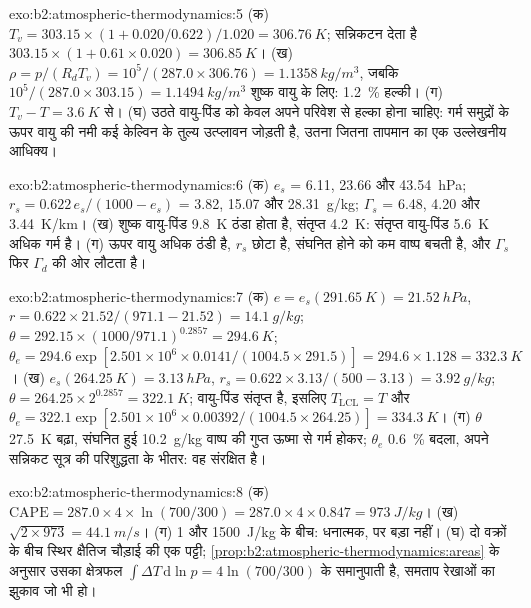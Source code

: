 \begin{solution}{exo:b2:atmospheric-thermodynamics:5}
(क) $T_v = 303.15 \times (1 + 0.020/0.622)/1.020 = \qty{306.76}{K}$; सन्निकटन देता है
$303.15 \times (1 + 0.61 \times 0.020) = \qty{306.85}{K}$। (ख) $\rho = p/(R_dT_v) = 10^5/(287.0
\times 306.76) = \qty{1.1358}{kg/m^3}$, जबकि $10^5/(287.0 \times 303.15) =
\qty{1.1494}{kg/m^3}$ शुष्क वायु के लिए: \qty{1.2}{\percent} हल्की। (ग) $T_v - T =
\qty{3.6}{K}$ से। (घ) उठते वायु-पिंड को केवल अपने परिवेश से हल्का होना चाहिए: गर्म समुद्रों के ऊपर
वायु की नमी कई केल्विन के तुल्य उत्प्लावन जोड़ती है, उतना जितना तापमान का
एक उल्लेखनीय आधिक्य।
\end{solution}

\begin{solution}{exo:b2:atmospheric-thermodynamics:6}
(क) $e_s$ = 6.11, 23.66 और \qty{43.54}{hPa}; $r_s = 0.622\,e_s/(1000 - e_s)$ = 3.82, 15.07 और
\qty{28.31}{g/kg}; $\Gamma_s$ = 6.48, 4.20 और \qty{3.44}{K/km}। (ख) शुष्क वायु-पिंड
\qty{9.8}{K} ठंडा होता है, संतृप्त \qty{4.2}{K}: संतृप्त वायु-पिंड \qty{5.6}{K} अधिक गर्म है।
(ग) ऊपर वायु अधिक ठंडी है, $r_s$ छोटा है, संघनित होने को कम वाष्प बचती है, और
$\Gamma_s$ फिर $\Gamma_d$ की ओर लौटता है।
\end{solution}

\begin{solution}{exo:b2:atmospheric-thermodynamics:7}
(क) $e = e_s(\qty{291.65}{K}) = \qty{21.52}{hPa}$, $r = 0.622 \times 21.52/(971.1 - 21.52) =
\qty{14.1}{g/kg}$; $\theta = 292.15 \times (1000/971.1)^{0.2857} = \qty{294.6}{K}$; $\theta_e =
294.6 \exp[2.501 \times 10^6 \times 0.0141/(1004.5 \times 291.5)] = 294.6 \times 1.128 =
\qty{332.3}{K}$। (ख) $e_s(\qty{264.25}{K}) = \qty{3.13}{hPa}$, $r_s = 0.622 \times 3.13/(500 -
3.13) = \qty{3.92}{g/kg}$; $\theta = 264.25 \times 2^{0.2857} = \qty{322.1}{K}$; वायु-पिंड
संतृप्त है, इसलिए $T_{\text{LCL}} = T$ और $\theta_e = 322.1 \exp[2.501 \times 10^6 \times
0.00392/(1004.5 \times 264.25)] = \qty{334.3}{K}$। (ग) $\theta$ \qty{27.5}{K} बढ़ा, संघनित हुई
\qty{10.2}{g/kg} वाष्प की गुप्त ऊष्मा से गर्म होकर; $\theta_e$ \qty{0.6}{\percent} बदला,
अपने सन्निकट सूत्र की परिशुद्धता के भीतर: वह संरक्षित है।
\end{solution}

\begin{solution}{exo:b2:atmospheric-thermodynamics:8}
(क) $\text{CAPE} = 287.0 \times 4 \times \ln(700/300) = 287.0 \times 4 \times 0.847 =
\qty{973}{J/kg}$। (ख) $\sqrt{2 \times 973} = \qty{44.1}{m/s}$। (ग) 1 और
\qty{1500}{J/kg} के बीच: धनात्मक, पर बड़ा नहीं। (घ) दो वक्रों के बीच स्थिर क्षैतिज चौड़ाई की एक
पट्टी; \cref{prop:b2:atmospheric-thermodynamics:areas} के अनुसार उसका क्षेत्रफल $\int
\Delta T\,\mathrm{d}\ln p = 4 \ln(700/300)$ के समानुपाती है, समताप रेखाओं का झुकाव जो भी हो।
\end{solution}


